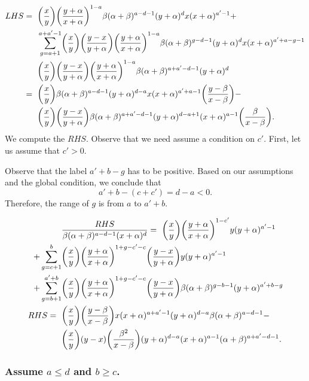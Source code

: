 \documentclass[ALCO, Unicode]{cedram}
\DeclarePairedDelimiter\autobracket{(}{)}
\newcommand{\br}[1]{\autobracket*{#1}}
\begin{document}
{\allowdisplaybreaks
\begin{align*}
LHS=\text{ }& \br{\dfrac{x}{y}}\br{\dfrac{y+\alpha}{x+\alpha}}^{1-a}\beta(\alpha+
              \beta)^{a-d-1}(y+\alpha)^d x (x+\alpha)^{a'-1}+\\
            & \sum^{a+a'-1}_{g=a+1} \br{\dfrac{x}{y}}\br{\dfrac{y-x}{y+\alpha}}\br{\dfrac{y+\alpha}{x+\alpha}}^{1-a} \beta(\alpha+\beta)^{g-d-1}(y+\alpha)^d x (x+\alpha)^{a'+a-g-1}\\
            &\br{\dfrac{x}{y}}\br{\dfrac{y-x}{y+\alpha}}\br{\dfrac{y+\alpha}{x+\alpha}}^{1-a} \beta(\alpha+\beta)^{a+a'-d-1}(y+\alpha)^d\\
     =\text{ }& \br{\dfrac{x}{y}} \beta (\alpha+\beta)^{a-d-1} (y+\alpha)^{d-a} x (x+\alpha)^{a'+a-1}\br{ \dfrac{y-\beta}{x-\beta}}-\\
             & \br{\dfrac{x}{y}} \br{\dfrac{y-x}{y+\alpha}}\beta (\alpha+\beta)^{a+a'-d-1}(y+\alpha)^{d-a+1} (x+\alpha)^{a-1} \br{\dfrac{\beta}{x-\beta}}.       
\end{align*}
}
We compute the $RHS$. Observe that we need assume a condition on $c'$. First, let us assume that $c'>0$.

Observe that the label $a'+b-g$ has to be positive. Based on our assumptions and the global condition, we conclude that
\[
a'+b-(c+c')=d-a<0.
\]
Therefore, the range of $g$ is from $a$ to $a'+b$.

{\allowdisplaybreaks
\begin{align*}
&\dfrac{RHS}{\beta (\alpha+\beta)^{a-d-1}(x+\alpha)^{d}}
           =\text{ } \br{\dfrac{x}{y}}\br{\dfrac{y+\alpha}{x+\alpha}}^{1-c'}y (y+\alpha)^{a'-1}\\
           +\sum^{b}_{g=c+1} &\br{\dfrac{x}{y}}\br{\dfrac{y+\alpha}{x+\alpha}}^{1+g-c'-c} \br{\dfrac{y-x}{y+\alpha}}y (y+\alpha)^{a'-1}\\
           +\sum^{a'+b}_{g=b+1}& \br{\dfrac{x}{y}}\br{\dfrac{y+\alpha}{x+\alpha}}^{1+g-c'-c} \br{\dfrac{y-x}{y+\alpha}}\beta (\alpha+\beta)^{g-b-1} (y+\alpha)^{a'+b-g}\\
    RHS =\text{ }&\br{\dfrac{x}{y}} \br{\dfrac{y-\beta}{x-\beta}} x(x+\alpha)^{a+a'-1}(y+\alpha)^{d-a}\beta(\alpha+\beta)^{a-d-1}-\\
           &\br{\dfrac{x}{y}}(y-x)\br{\dfrac{\beta^2}{x-\beta}}
           (y+\alpha)^{d-a}(x+\alpha)^{a-1}(\alpha+\beta)^{a+a'-d-1}.
\end{align*}
}

\subsubsection{Assume \texorpdfstring{$a\leq d$ and $b\geq c$}{a<=d and b>=c}.}
\end{document}
